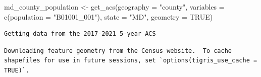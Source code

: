 \documentclass[
  letterpaper,
  DIV=11,
  numbers=noendperiod]{scrreprt}
\newenvironment{Shaded}{\begin{snugshade}}{\end{snugshade}}
\newcommand{\AttributeTok}[1]{\textcolor[rgb]{0.40,0.45,0.13}{#1}}
\newcommand{\ConstantTok}[1]{\textcolor[rgb]{0.56,0.35,0.01}{#1}}
\newcommand{\FunctionTok}[1]{\textcolor[rgb]{0.28,0.35,0.67}{#1}}
\newcommand{\NormalTok}[1]{\textcolor[rgb]{0.00,0.23,0.31}{#1}}
\newcommand{\OtherTok}[1]{\textcolor[rgb]{0.00,0.23,0.31}{#1}}
\newcommand{\StringTok}[1]{\textcolor[rgb]{0.13,0.47,0.30}{#1}}
\begin{document}
\begin{Shaded}
\begin{Highlighting}[]
\NormalTok{md\_county\_population }\OtherTok{\textless{}{-}} \FunctionTok{get\_acs}\NormalTok{(}\AttributeTok{geography =} \StringTok{"county"}\NormalTok{,}
              \AttributeTok{variables =} \FunctionTok{c}\NormalTok{(}\AttributeTok{population =} \StringTok{"B01001\_001"}\NormalTok{),}
              \AttributeTok{state =} \StringTok{"MD"}\NormalTok{,}
              \AttributeTok{geometry =} \ConstantTok{TRUE}\NormalTok{)}
\end{Highlighting}
\end{Shaded}

\begin{verbatim}
Getting data from the 2017-2021 5-year ACS
\end{verbatim}

\begin{verbatim}
Downloading feature geometry from the Census website.  To cache shapefiles for use in future sessions, set `options(tigris_use_cache = TRUE)`.
\end{verbatim}
\end{document}
